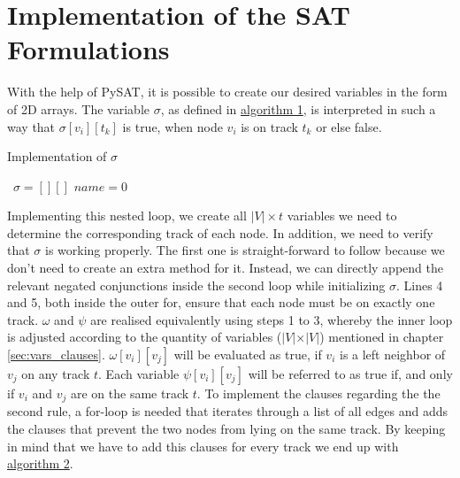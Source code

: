\documentclass[bachelor, english]{algothesis}
\begin{document}
\section{Implementation of the SAT Formulations}
With the help of PySAT, it is possible to create our desired variables in the form of 2D arrays. The variable $\sigma$, as defined in \hyperlink{alg:sigma}{algorithm 1}, is interpreted in such a way that $\sigma[v_i][t_k]$ is true, when node $v_i$ is on track $t_k$ or else false.

\begin{algorithm}[ht]
    \caption{Implementation of $\sigma$}
    \label{alg:sigma}
        $\, \, \, \sigma = [][]$ \newline
        $name = 0$ \newline
\end{algorithm}
\noindent
Implementing this nested loop, we create all $ \vert V \vert \times t$ variables we need to determine the corresponding track of each node. In addition, we need to verify that $\sigma$ is working properly. The first one is straight-forward to follow because we don't need to create an extra method for it. Instead, we can directly append the relevant negated conjunctions inside the second loop while initializing $\sigma$. Lines 4 and 5, both inside the outer for, ensure that each node must be on exactly one track. $\omega$ and $\psi$ are realised equivalently using steps 1 to 3, whereby the inner loop is adjusted according to the quantity of variables ($ \vert V \vert \times \vert V \vert$) mentioned in chapter \ref{sec:vars_clauses}. $\omega[v_i][v_j]$ will be evaluated as true, if $v_i$ is a left neighbor of $v_j$ on any track $t$. Each variable $\psi[v_i][v_j]$ will be referred to as true if, and only if $v_i$ and $v_j$ are on the same track $t$. To implement the clauses regarding the the second rule, a for-loop is needed that iterates through a list of all edges and adds the clauses that prevent the two nodes from lying on the same track. By keeping in mind that we have to add this clauses for every track we end up with \hyperlink{alg:second_rule}{algorithm 2}.
\end{document}
